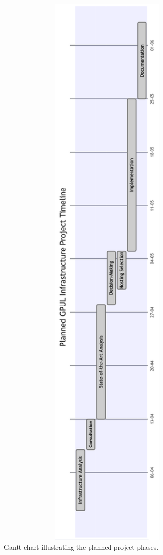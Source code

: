 \begin{figure}[H]
  \centering
  \includegraphics[width=1\textwidth]{imaxes/gantt-planned.png}
  \caption{Gantt chart illustrating the planned project phases.}
  \label{fig:gantt-planned}
\end{figure}

